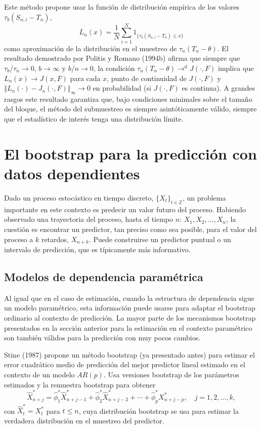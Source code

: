 \documentclass[]{book}
\theoremstyle{definition}
\theoremstyle{definition}
\theoremstyle{definition}
\theoremstyle{remark}
\begin{document}
Este método propone usar la función de distribución empírica de los
valores \(\tau _{b}(S_{n,i}-T_n)\),
\[L_n(x)=\frac{1}{N}\sum_{i=1}^{N}1_{\{\tau _{b}(S_{n,i}-T_n)\leq x\}}\]como
aproximación de la distribución en el muestreo de
\(\tau _n(T_n-\theta )\). El resultado demostrado por Politis y Romano
(1994b) afirma que siempre que \(\tau _{b}/\tau _n\rightarrow 0\),
\(b\rightarrow \infty\) y \(b/n\rightarrow 0\), la condición
\(\tau _n(T_n-\theta ){ \rightarrow }^{\mathrm{d}}J(\cdot ,F)\) implica
que \(L_n(x)\rightarrow J(x,F)\) para cada \(x\), punto de continuidad
de \(J(\cdot ,F)\) y
\(\left\Vert L_n(\cdot )-J_n(\cdot ,F)\right\Vert _{\infty }\rightarrow 0\)
en probabilidad (si \(J(\cdot ,F)\) es continua). A grandes rasgos este
resultado garantiza que, bajo condiciones minimales sobre el tamaño del
bloque, el método del submuestreo es siempre asintóticamente válido,
siempre que el estadístico de interés tenga una distribución límite.

\section{El bootstrap para la predicción con datos
dependientes}\label{el-bootstrap-para-la-prediccion-con-datos-dependientes}

Dado un proceso estocástico en tiempo discreto,
\(\{X_{t}\}_{t\in \mathbb{ Z}}\), un problema importante en este
contexto es predecir un valor futuro del proceso. Habiendo observado una
trayectoria del proceso, hasta el tiempo \(n\): \(X_1,X_2,\ldots ,X_n\),
la cuestión es encontrar un predictor, tan preciso como sea posible,
para el valor del proceso a \(k\) retardos, \(X_{n+k}\). Puede
construirse un predictor puntual o un intervalo de predicción, que es
típicamente más informativo.

\subsection{Modelos de dependencia
paramétrica}\label{modelos-de-dependencia-parametrica}

Al igual que en el caso de estimación, cuando la estructura de
dependencia sigue un modelo paramétrico, esta información puede usarse
para adaptar el bootstrap ordinario al contexto de predicción. La mayor
parte de los mecanismos bootstrap presentados en la sección anterior
para la estimación en el contexto paramétrico son también válidos para
la predicción con muy pocos cambios.

Stine (1987) propone un método bootstrap (ya presentado antes) para
estimar el error cuadrático medio de predicción del mejor predictor
lineal estimado en el contexto de un modelo \(AR(p)\). Usa versiones
bootstrap de los parámetros estimados y la remuestra bootstrap para
obtener \[\widehat{X}_{n+j}^{\ast}=\widehat{\phi}_1^{\ast}\widehat{X}
_{n+j-1}^{\ast}+\widehat{\phi}_2^{\ast}\widehat{X}_{n+j-2}^{\ast
}+\cdots +\widehat{\phi}_{p}^{\ast}X_{n+j-p}^{\ast},\quad j=1,2,\ldots ,k,\]con
\(\widehat{X}_{t}^{\ast}=X_{t}^{\ast}\) para \(t\leq n\), cuya
distribución bootstrap se usa para estimar la verdadera distribución en
el muestreo del predictor.
\end{document}
